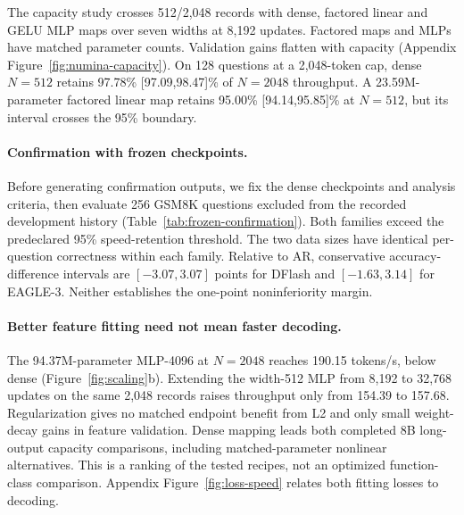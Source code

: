 \documentclass{article}
\begin{document}
The capacity study crosses 512/2,048 records with dense, factored linear
and GELU MLP maps over seven widths at 8,192 updates. Factored maps and
MLPs have matched parameter counts. Validation gains flatten with capacity
(Appendix Figure~\ref{fig:numina-capacity}). On 128 questions at a
2,048-token cap, dense $N=512$ retains 97.78\% [97.09,98.47]\% of
$N=2048$ throughput.
A 23.59M-parameter factored linear map retains 95.00\%
[94.14,95.85]\% at $N=512$, but its interval crosses the 95\% boundary.

\paragraph{Confirmation with frozen checkpoints.}
Before generating confirmation outputs, we fix the dense checkpoints and
analysis criteria, then evaluate 256 GSM8K questions excluded from the
recorded development history (Table~\ref{tab:frozen-confirmation}).
Both families exceed the predeclared 95\% speed-retention threshold.
The two data sizes have identical per-question correctness within each
family. Relative to AR, conservative accuracy-difference intervals are
$[-3.07,3.07]$ points for DFlash and $[-1.63,3.14]$ for EAGLE-3.
Neither establishes the one-point noninferiority margin.

\begin{table}[H]
\caption{Frozen small-data confirmation on 256 GSM8K questions.
Retention is a percentage relative to the 2,048-example mapper in the
same family, with paired 95\% intervals. Outputs are capped at 2,048 tokens.}
\label{tab:frozen-confirmation}
\centering\small

\end{table}

\paragraph{Better feature fitting need not mean faster decoding.}
The 94.37M-parameter MLP-4096 at $N=2048$ reaches 190.15 tokens/s,
below dense (Figure~\ref{fig:scaling}b). Extending the width-512 MLP from 8,192 to 32,768 updates
on the same 2,048 records raises throughput only from 154.39 to 157.68.
Regularization gives no matched endpoint benefit from L2 and only
small weight-decay gains in feature validation. Dense mapping leads
both completed 8B long-output capacity comparisons, including
matched-parameter nonlinear alternatives. This is a ranking of the
tested recipes, not an optimized function-class comparison.
Appendix Figure~\ref{fig:loss-speed} relates both fitting losses to decoding.
\end{document}
